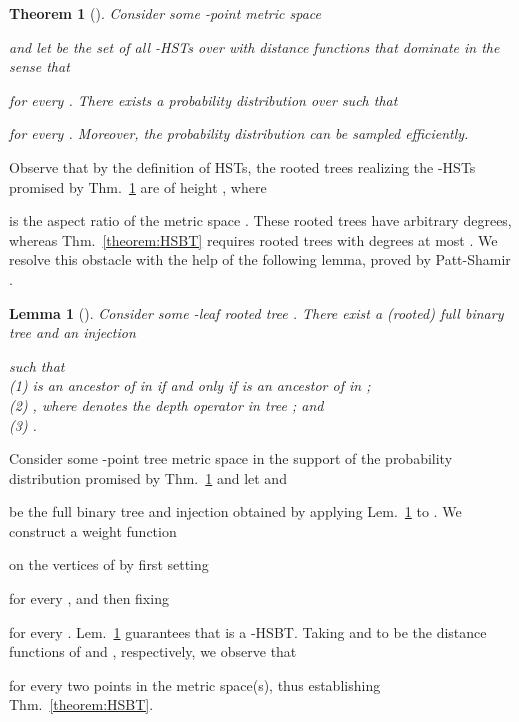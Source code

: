 \documentclass[11pt]{article}
\def\LongVersionEnd{}
\newtheorem{theorem}{Theorem}[section]
\newtheorem{lemma}[theorem]{Lemma}
\theoremstyle{definition}
\theoremstyle{plain}
\newtheorem{theorem}{Theorem}
\newtheorem{lemma}[theorem]{Lemma}
\theoremstyle{definition}
\theoremstyle{plain}
\newtheorem{theorem}{Theorem}[section]
\newtheorem{lemma}{Lemma}[section]
\theoremstyle{definition}
\theoremstyle{plain}
\newcommand{\Thm}{Thm.}
\newcommand{\Lem}{Lem.}
\begin{document}
\begin{theorem}[\cite{FakcharoenpholRT2004}] \label{theorem:FRT}
Consider some -point metric space

and let  be the set of all -HSTs over  with distance
functions  that dominate  in the sense that

for every .
There exists a probability distribution  over  such
that

for every .
Moreover, the probability distribution  can be sampled
efficiently.
\end{theorem}

Observe that by the definition of HSTs, the rooted trees realizing the
-HSTs promised by \Thm{}~\ref{theorem:FRT} are of height
,
where

is the aspect ratio of the metric space
.
These rooted trees have arbitrary degrees, whereas \Thm{}~\ref{theorem:HSBT}
requires rooted trees with degrees at most .
We resolve this obstacle with the help of the following lemma, proved by
Patt-Shamir \cite{PattShamir2015}.

\begin{lemma}[\cite{PattShamir2015}] \label{lemma:Boaz}
Consider some -leaf rooted tree .
There exist
a (rooted) full binary tree  and an injection

such that \\
(1)
 is an ancestor of  in  if and only if  is an ancestor of
 in ; \\
(2)
, where
 denotes the depth operator in tree ; and \\
(3)
.
\end{lemma}

Consider some -point tree metric space  in the support of the
probability distribution promised by \Thm{}~\ref{theorem:FRT} and let  and

be the full binary tree and injection obtained by applying
\Lem{}~\ref{lemma:Boaz} to .
We construct a weight function

on the vertices of  by first setting

for every
,
and then fixing

for every
.
\Lem{}~\ref{lemma:Boaz} guarantees that
 is a -HSBT.
Taking  and  to be the distance functions of  and
, respectively, we observe that

for every two points  in the metric space(s), thus establishing
\Thm{}~\ref{theorem:HSBT}.

\LongVersionEnd 

\clearpage
\renewcommand{\thepage}{}
\end{document}
